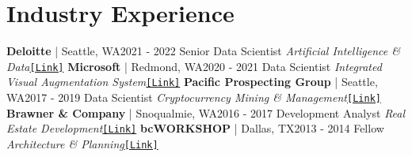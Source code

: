 \documentclass{article}
\begin{document}
    \section*{Industry Experience}
        \textbf{Deloitte} | Seattle, WA\hfill{2021 - 2022}\newline
        Senior Data Scientist\newline
        \textit{Artificial Intelligence \& Data}\space\href{https://www2.deloitte.com/be/en/pages/strategy-operations/strategy-analytics-mergers-acquisitions/topics/analytics-and-cognitive.html}{\texttt{[Link]}}\newline\newline
        \textbf{Microsoft} | Redmond, WA\hfill{2020 - 2021}\newline
        Data Scientist\newline
        \textit{Integrated Visual Augmentation System}\space\href{https://news.microsoft.com/transform/u-s-army-to-use-hololens-technology-in-high-tech-headsets-for-soldiers/}{\texttt{[Link]}}\newline\newline
        \textbf{Pacific Prospecting Group} | Seattle, WA\hfill{2017 - 2019}\newline
        Data Scientist\newline
        \textit{Cryptocurrency Mining \& Management}\space\href{http://pacificprospectinggroup.com}{\texttt{[Link]}}\newline\newline
        \textbf{Brawner \& Company} | Snoqualmie, WA\hfill{2016 - 2017}\newline
        Development Analyst\newline
        \textit{Real Estate Development}\space\href{https://jhbrawner.com}{\texttt{[Link]}}\newline\newline
        \textbf{bcWORKSHOP} | Dallas, TX\hfill{2013 - 2014}\newline
        Fellow\newline
        \textit{Architecture \& Planning}\space\href{https://www.bcworkshop.org}{\texttt{[Link]}}
\end{document}
